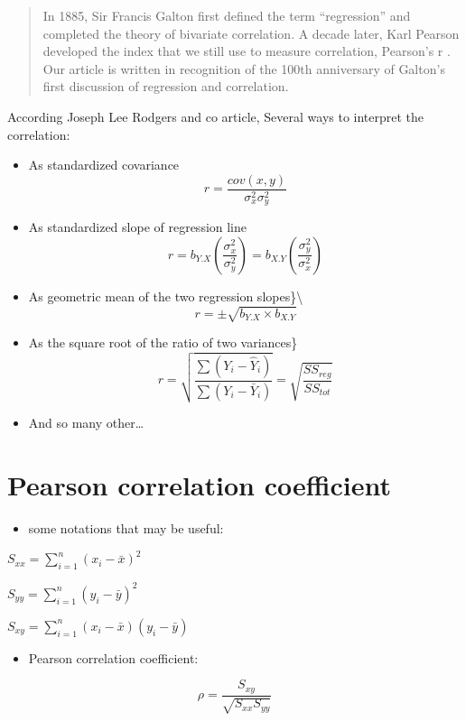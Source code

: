 \documentclass[
]{report}
\providecommand{\tightlist}{%
  \setlength{\itemsep}{0pt}\setlength{\parskip}{0pt}}
\begin{document}
\begin{quote}
In 1885, Sir Francis Galton first defined the term ``regression'' and completed the theory of bivariate correlation. A decade later, Karl Pearson developed the index that we still use to measure correlation, Pearson's r . Our article is written in recognition of the 100th anniversary of Galton's first discussion of regression and correlation.
\end{quote}

According Joseph Lee Rodgers and co article, Several ways to interpret the correlation:

\begin{itemize}
\tightlist
\item
  As standardized covariance
  \[r=\frac{cov(x,y)}{\sigma^2_x\sigma^2_y}\]
\item
  As standardized slope of regression line
  \[r=b_{Y.X}(\frac{\sigma^2_x}{\sigma^2_y})=b_{X.Y}(\frac{\sigma^2_y}{\sigma^2_x})\]
\item
  As geometric mean of the two regression slopes\}\textbackslash{}
  \[r=\pm\sqrt{b_{Y.X}\times b_{X.Y}}\]
\item
  As the square root of the ratio of two variances\}
  \[r=\sqrt{\frac{\sum(Y_i -\hat{Y}_i)}{\sum(Y_i -\bar{Y}_i)}}=\sqrt{\frac{SS_{reg}}{SS_{tot}}}\]
\item
  And so many other\ldots{}
\end{itemize}

\hypertarget{pearson-correlation-coefficient}{%
\section{Pearson correlation coefficient}\label{pearson-correlation-coefficient}}

\begin{itemize}
\tightlist
\item
  some notations that may be useful:
\end{itemize}

\(S_{xx} = \sum_{i=1}^n(x_i -\bar{x})^2\)

\(S_{yy} = \sum_{i=1}^n(y_i -\bar{y})^2\)

\(S_{xy} = \sum_{i=1}^n(x_i -\bar{x})(y_i -\bar{y})\)

\begin{itemize}
\tightlist
\item
  Pearson correlation coefficient:
\end{itemize}

\[\rho=\frac{S_{xy}}{\sqrt{S_{xx}S_{yy}}}\]
\end{document}
